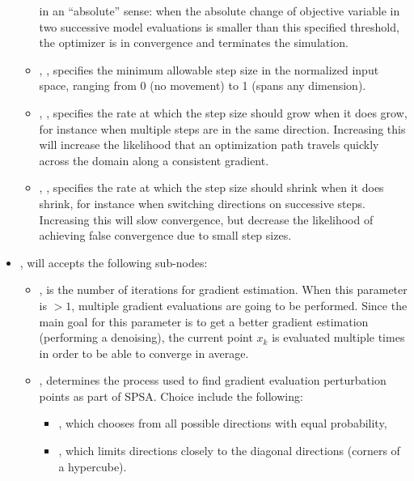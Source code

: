 \begin{itemize}
\begin{itemize}
  in an ``absolute'' sense: when the absolute change of objective variable in two successive model evaluations is smaller
  than this specified threshold, the  optimizer is in convergence and terminates the simulation.
  \item {}, , specifies the minimum allowable step size in
    the normalized input space, ranging from 0 (no movement) to 1 (spans any dimension).
  \item {}, , specifies the rate at which the step size
    should grow when it does grow, for instance when multiple steps are in the same direction.  Increasing
    this will increase the likelihood that an optimization path travels quickly across the domain along a
    consistent gradient.
  \item {}, , specifies the rate at which the step size
    should shrink when it does shrink, for instance when switching directions on successive steps.  Increasing
    this will slow convergence, but decrease the likelihood of achieving false convergence due to small step
    sizes.
  \end{itemize}
\item {},  will accepts the following sub-nodes:
  \begin{itemize}
  \item {},  is the number of iterations for gradient estimation. When this
        parameter is $>1$, multiple gradient evaluations are going to be performed. Since the main goal for this parameter is to
        get a better gradient estimation (performing a denoising), the current point $x_k$ is evaluated multiple times in order to be able to
        converge in average.

  \item {},  determines the process used to find
        gradient evaluation perturbation points as part of SPSA. Choice include the following:
        \begin{itemize}
          \item {}, which chooses from all possible directions with equal probability,
          \item {}, which limits directions closely to the diagonal directions (corners of
                                       a hypercube).
        \end{itemize}


\end{itemize}
\end{itemize}
